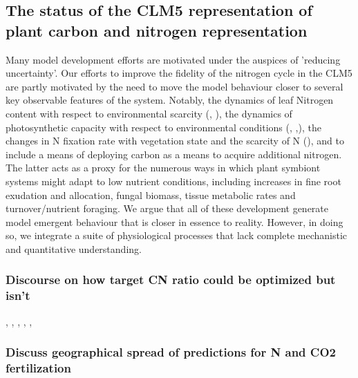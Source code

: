 \documentclass[draft,linenumbers]{agujournal}
\begin{document}
\subsection{The status of the CLM5 representation of plant carbon and nitrogen representation}
Many model development efforts are motivated under the auspices of 'reducing uncertainty'.  Our efforts to improve the fidelity of the nitrogen cycle in the CLM5 are partly motivated by the need to move the model behaviour closer to several key observable features of the system. Notably, the dynamics of leaf Nitrogen content with respect to environmental scarcity (\cite{zaehle2014}, \cite{brzostek2014}), the dynamics of photosynthetic capacity with respect to environmental conditions (\cite{xu2012}, \cite{ali2016},\cite{rogers2017}), the changes in N fixation rate with vegetation state and the scarcity of N (\cite{vitousek2002}), and to include a means of deploying carbon as a means to acquire additional nitrogen. The latter acts as a proxy for the numerous ways in which plant symbiont systems might adapt to low nutrient conditions, including increases in fine root exudation and allocation, fungal biomass, tissue metabolic rates and turnover/nutrient foraging.  We argue that all of these development generate model emergent behaviour that is closer in essence to reality. However, in doing so, we integrate a suite of physiological processes that lack complete mechanistic and quantitative understanding.

\subsubsection{Discourse on how target CN ratio could be optimized but isn't}

\cite{thomas2014}, \cite{friedlingstein1999}, \cite{franklin2012}, \cite{mcmurtrie2013}, \cite{anten2011}, \cite{vanwijk2003}


\subsubsection{Discuss geographical spread of predictions for N and CO2 fertilization}

\cite{hickler2008}
\end{document}
